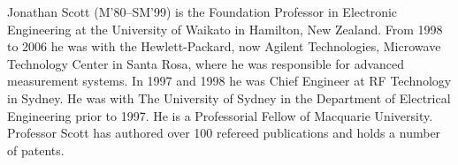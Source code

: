 \documentclass[journal, a4paper]{IEEEtran}
\begin{document}
\begin{IEEEbiography}{Jonathan Scott}
(M'80--SM'99) is the Foundation Professor in
Electronic Engineering at the University of Waikato in Hamilton, New
Zealand.  From 1998 to 2006 he was with the Hewlett-Packard,
now Agilent Technologies, Microwave Technology Center in Santa Rosa,
where he was responsible for advanced measurement systems.  In 1997 and
1998 he was Chief Engineer at RF Technology in Sydney.  He was with The
University of Sydney in the Department of Electrical Engineering prior
to 1997.  He is a Professorial Fellow of Macquarie
University.  Professor Scott has authored over 100 refereed
publications and holds a number of patents.
\end{IEEEbiography}
\end{document}
